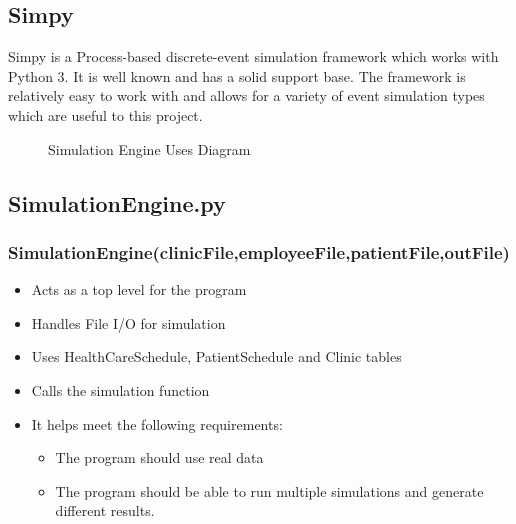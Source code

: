 \documentclass[12pt]{article}
\begin{document}
\subsection{Simpy}
Simpy is a Process-based discrete-event simulation framework which works with Python 3. It is well known and has a solid support base. The framework is relatively easy to work with and allows for a variety of event simulation types which are useful to this project. 

\begin{figure}[H]
\centering
    \caption{Simulation Engine Uses Diagram}
\end{figure}


\subsection{SimulationEngine.py}
\subsubsection{SimulationEngine(clinicFile,employeeFile,patientFile,outFile)}
\begin{itemize}  
\item Acts as a top level for the program
\item Handles File I/O for simulation
\item Uses HealthCareSchedule, PatientSchedule and Clinic tables
\item Calls the simulation function
\item It helps meet the following requirements:
	\begin{itemize}
	\item The program should use real data
	\item The program should be able to run multiple simulations and generate different results.
	\end{itemize}
\end{itemize}
\end{document}
